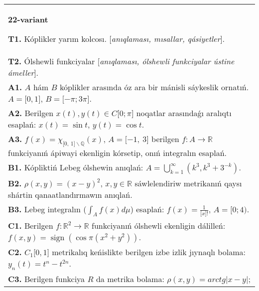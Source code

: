 \documentclass{article}
\DeclareMathOperator{\sign}{sign}
\begin{document}
\begin{tabular}{m{17cm}}
\textbf{22-variant}
\newline

\textbf{T1.} Kóplikler yarım kolcosı. [\textit{anıqlaması, mısallar, qásiyetler}]. \\
\textbf{T2.} Ólshewli funkciyalar [\textit{anıqlaması, ólshewli funkciyalar ústine ámeller}]. \\
\textbf{A1.} \(A\) hám \(B\) kóplikler arasında óz ara bir mánisli sáykeslik ornatıń. \(A = \lbrack 0,1\rbrack\), \(B = \lbrack - \pi;3\pi\rbrack\). \\
\textbf{A2.} Berilgen \(x(t),y(t) \in C\lbrack 0;\pi\rbrack\) noqatlar arasındaǵı aralıqtı esaplań: \(x(t) = \sin t\), \(y(t) = \cos t\). \\
\textbf{A3.} \(f(x) = \chi_{\lbrack 0,\ 1\rbrack\backslash\mathbb{Q}}(x)\), \(A = \lbrack - 1,\ 3\rbrack\) berilgen \(f:A\rightarrow\mathbb{R}\) funkciyanıń ápiwayi ekenligin kórsetip, onıń integralın esaplań. \\
\textbf{B1.} Kópliktiń Lebeg ólshewin anıqlań: \(A = \bigcup_{k = 1}^{\infty}\left( k^{3},k^{3} + 3^{- k} \right)\). \\
\textbf{B2.} \(\rho(x,y) = (x - y)^{2}\), \(x,y\mathbb{\in R}\) sáwlelendiriw metrikanıń qaysı shártin qanaatlandırmawın anıqlań. \\
\textbf{B3.} Lebeg integralın (\(\int_{A}^{}{f(x)d\mu}\)) esaplań: \(f(x) = \frac{1}{\lbrack x\rbrack!}\), \(A = \lbrack 0;4)\). \\
\textbf{C1.} Berilgen \(f:\mathbb{R}^{2}\mathbb{\rightarrow R}\) funkciyanıń ólshewli ekenligin dálilleń: \(f(x,y) = \sign\left( \cos\pi\left( x^{2} + y^{2} \right) \right)\). \\
\textbf{C2.} \(C_{1}\lbrack 0,1\rbrack\) metrikalıq keńislikte berilgen izbe izlik jıynaqlı bolama: \(y_{n}(t) = t^{n} - t^{2n}\). \\
\textbf{C3.} Berilgen funkciya \(R\) da metrika bolama: \(\rho(x,y) = arctg|x - y|\); \\

\end{tabular}
\vspace{1cm}
\end{document}
